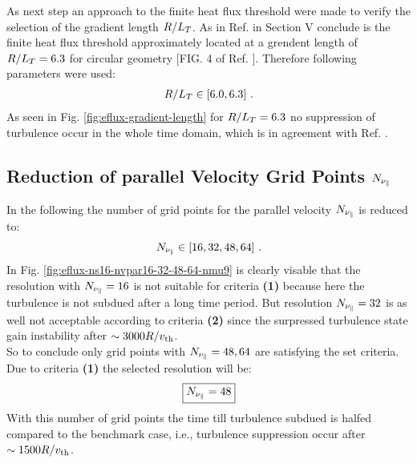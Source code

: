 As next step an approach to the finite heat flux threshold were made to verify the selection of the gradient length $R/L_T$. As in Ref.  in Section V conclude is the finite heat flux threshold approximately located at a grendent length of $R/L_T = 6.3$ for circular geometry [FIG. 4 of Ref. ]. Therefore following parameters were used:
\begin{gather*}
	R/L_T \in [6.0, 6.3]~.
\end{gather*}
As seen in Fig. \ref{fig:eflux-gradient-length} for $R/L_T = 6.3$ no suppression of turbulence occur in the whole time domain, which is in agreement with Ref. .


\subsection{Reduction of parallel Velocity Grid Points $N_{\nu_\parallel}$}
\label{sub:reduceNvpar}

In the following the number of grid points for the parallel velocity $N_{\nu_\parallel}$ is reduced to:
\begin{gather*}
	N_{\nu_\parallel} \in [16, 32, 48, 64]~.
\end{gather*}
In Fig. \ref{fig:eflux-ns16-nvpar16-32-48-64-nmu9} is clearly visable that the resolution with $N_{\nu_\parallel} = 16$ is not suitable for criteria \textbf{(1)} because here the turbulence is not subdued after a long time period. But resolution $N_{\nu_\parallel} = 32$ is as well not acceptable according to criteria \textbf{(2)} since the surpressed turbulence state gain instability after $\sim 3000 R/v_{\mathrm{th}}$.\\
So to conclude only grid points with $N_{\nu_\parallel} = 48, 64$ are satisfying the set criteria. Due to criteria \textbf{(1)} the selected resolution will be:
\begin{gather*}
	\boxed{N_{\nu_\parallel} = 48}
\end{gather*}
With this number of grid points the time till turbulence subdued is halfed compared to the benchmark case, i.e., turbulence suppression occur after $\sim 1500 R/v_{\mathrm{th}}$.


